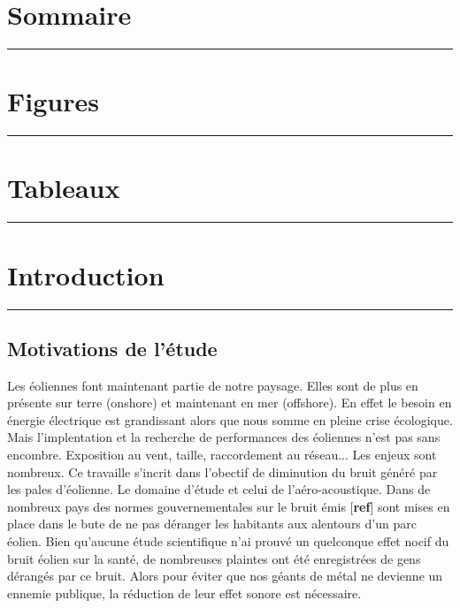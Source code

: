 \documentclass[12pt]{article}
\theoremstyle{plain}
\theoremstyle{remark}
\begin{document}
	\newpage
	
	\section*{Sommaire}
	
	\noindent\rule{\textwidth}{0.3pt}
	\vspace{0.5cm}
	

\clearpage
\section*{\Large Figures}
\noindent\rule{\textwidth}{0.3pt}
\vspace{0.5cm}

\listoffigures

\clearpage
\section*{\Large Tableaux}
\noindent\rule{\textwidth}{0.3pt}
\vspace{0.5cm}

\listoftables
	
\clearpage
	
	
	\section{Introduction}
	\noindent\rule{\linewidth}{2pt}
	\vspace{0.1cm}
	\subsection{Motivations de l'étude}
	
	Les éoliennes font maintenant partie de notre paysage. Elles sont de plus en présente sur terre (onshore) et maintenant en mer (offshore). En effet le besoin en énergie électrique est grandissant alors que nous somme en pleine crise écologique. Mais l'implentation et la recherche de performances des éoliennes n'est pas sans encombre. Exposition au vent, taille, raccordement au réseau... Les enjeux sont nombreux. Ce travaille s'incrit dans l'obectif de diminution du bruit généré par les pales d'éolienne. Le domaine d'étude et celui de l'aéro-acoustique. Dans de nombreux pays des normes gouvernementales sur le bruit émis [{\bf ref}] sont mises en place dans le bute de ne pas déranger les habitants aux alentours d'un parc éolien. Bien qu'aucune étude scientifique n'ai prouvé un quelconque effet nocif du bruit éolien sur la santé, de nombreuses plaintes ont été enregistrées de gens dérangés par ce bruit. Alors pour éviter que nos géants de métal ne devienne un ennemie publique, la réduction de leur effet sonore est nécessaire. \\
	
\end{document}
